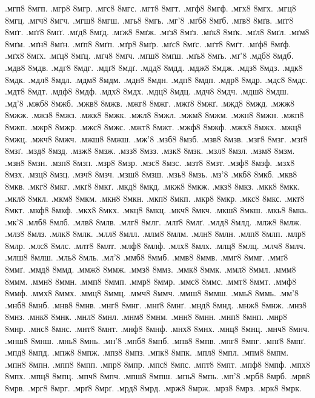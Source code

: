 {.мгп8
8мгп.
.мгр8
8мгр.
.мгс8
8мгс.
.мгт8
8мгт.
.мгф8
8мгф.
.мгх8
8мгх.
.мгц8
8мгц.
.мгч8
8мгч.
.мгш8
8мгш.
.мгь8
8мгь.
.мг'8
.мґб8
8мґб.
.мґв8
8мґв.
.мґг8
8мґг.
.мґґ8
8мґґ.
.мґд8
8мґд.
.мґж8
8мґж.
.мґз8
8мґз.
.мґк8
8мґк.
.мґл8
8мґл.
.мґм8
8мґм.
.мґн8
8мґн.
.мґп8
8мґп.
.мґр8
8мґр.
.мґс8
8мґс.
.мґт8
8мґт.
.мґф8
8мґф.
.мґх8
8мґх.
.мґц8
8мґц.
.мґч8
8мґч.
.мґш8
8мґш.
.мґь8
8мґь.
.мґ'8
.мдб8
8мдб.
.мдв8
8мдв.
.мдг8
8мдг.
.мдґ8
8мдґ.
.мдд8
8мдд.
.мдж8
8мдж.
.мдз8
8мдз.
.мдк8
8мдк.
.мдл8
8мдл.
.мдм8
8мдм.
.мдн8
8мдн.
.мдп8
8мдп.
.мдр8
8мдр.
.мдс8
8мдс.
.мдт8
8мдт.
.мдф8
8мдф.
.мдх8
8мдх.
.мдц8
8мдц.
.мдч8
8мдч.
.мдш8
8мдш.
.мд'8
.мжб8
8мжб.
.мжв8
8мжв.
.мжг8
8мжг.
.мжґ8
8мжґ.
.мжд8
8мжд.
.мжж8
8мжж.
.мжз8
8мжз.
.мжк8
8мжк.
.мжл8
8мжл.
.мжм8
8мжм.
.мжн8
8мжн.
.мжп8
8мжп.
.мжр8
8мжр.
.мжс8
8мжс.
.мжт8
8мжт.
.мжф8
8мжф.
.мжх8
8мжх.
.мжц8
8мжц.
.мжч8
8мжч.
.мжш8
8мжш.
.мж'8
.мзб8
8мзб.
.мзв8
8мзв.
.мзг8
8мзг.
.мзґ8
8мзґ.
.мзд8
8мзд.
.мзж8
8мзж.
.мзз8
8мзз.
.мзк8
8мзк.
.мзл8
8мзл.
.мзм8
8мзм.
.мзн8
8мзн.
.мзп8
8мзп.
.мзр8
8мзр.
.мзс8
8мзс.
.мзт8
8мзт.
.мзф8
8мзф.
.мзх8
8мзх.
.мзц8
8мзц.
.мзч8
8мзч.
.мзш8
8мзш.
.мзь8
8мзь.
.мз'8
.мкб8
8мкб.
.мкв8
8мкв.
.мкг8
8мкг.
.мкґ8
8мкґ.
.мкд8
8мкд.
.мкж8
8мкж.
.мкз8
8мкз.
.мкк8
8мкк.
.мкл8
8мкл.
.мкм8
8мкм.
.мкн8
8мкн.
.мкп8
8мкп.
.мкр8
8мкр.
.мкс8
8мкс.
.мкт8
8мкт.
.мкф8
8мкф.
.мкх8
8мкх.
.мкц8
8мкц.
.мкч8
8мкч.
.мкш8
8мкш.
.мкь8
8мкь.
.мк'8
.млб8
8млб.
.млв8
8млв.
.млг8
8млг.
.млґ8
8млґ.
.млд8
8млд.
.млж8
8млж.
.млз8
8млз.
.млк8
8млк.
.млл8
8млл.
.млм8
8млм.
.млн8
8млн.
.млп8
8млп.
.млр8
8млр.
.млс8
8млс.
.млт8
8млт.
.млф8
8млф.
.млх8
8млх.
.млц8
8млц.
.млч8
8млч.
.млш8
8млш.
.мль8
8мль.
.мл'8
.ммб8
8ммб.
.ммв8
8ммв.
.ммг8
8ммг.
.ммґ8
8ммґ.
.ммд8
8ммд.
.ммж8
8ммж.
.ммз8
8ммз.
.ммк8
8ммк.
.ммл8
8ммл.
.ммм8
8ммм.
.ммн8
8ммн.
.ммп8
8ммп.
.ммр8
8ммр.
.ммс8
8ммс.
.ммт8
8ммт.
.ммф8
8ммф.
.ммх8
8ммх.
.ммц8
8ммц.
.ммч8
8ммч.
.ммш8
8ммш.
.ммь8
8ммь.
.мм'8
.мнб8
8мнб.
.мнв8
8мнв.
.мнг8
8мнг.
.мнґ8
8мнґ.
.мнд8
8мнд.
.мнж8
8мнж.
.мнз8
8мнз.
.мнк8
8мнк.
.мнл8
8мнл.
.мнм8
8мнм.
.мнн8
8мнн.
.мнп8
8мнп.
.мнр8
8мнр.
.мнс8
8мнс.
.мнт8
8мнт.
.мнф8
8мнф.
.мнх8
8мнх.
.мнц8
8мнц.
.мнч8
8мнч.
.мнш8
8мнш.
.мнь8
8мнь.
.мн'8
.мпб8
8мпб.
.мпв8
8мпв.
.мпг8
8мпг.
.мпґ8
8мпґ.
.мпд8
8мпд.
.мпж8
8мпж.
.мпз8
8мпз.
.мпк8
8мпк.
.мпл8
8мпл.
.мпм8
8мпм.
.мпн8
8мпн.
.мпп8
8мпп.
.мпр8
8мпр.
.мпс8
8мпс.
.мпт8
8мпт.
.мпф8
8мпф.
.мпх8
8мпх.
.мпц8
8мпц.
.мпч8
8мпч.
.мпш8
8мпш.
.мпь8
8мпь.
.мп'8
.мрб8
8мрб.
.мрв8
8мрв.
.мрг8
8мрг.
.мрґ8
8мрґ.
.мрд8
8мрд.
.мрж8
8мрж.
.мрз8
8мрз.
.мрк8
8мрк.
}
